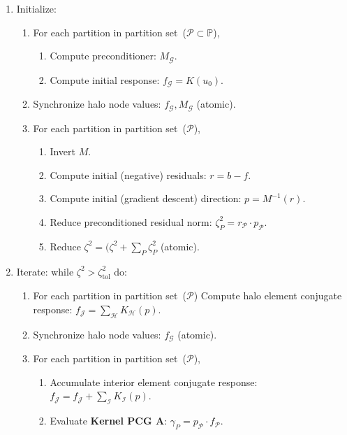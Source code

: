 \documentclass[]             %
{NASA}                       %
\begin{document}
\begin{algorithm}[ht] %
\caption{Latency-hiding parallel preconditioned conjugate gradient method}
\label{alg:halo-pcg}
\begin{enumerate}
\item Initialize:
\begin{enumerate}
\item For each partition in partition set~($\mathcal{P} \subset \mathbb{P}$),
\begin{enumerate}
\item Compute preconditioner: $M_{\mathcal{G}}$.
\item Compute initial response: $f_{\mathcal{G}}=K({u}_{0})$.
\end{enumerate}
\item Synchronize halo node values: $f_{\mathcal{G}},M_{\mathcal{G}}$ (atomic).
\item For each partition in partition set~($\mathcal{P}$),
\begin{enumerate}
\item Invert $M$.
\item Compute initial (negative) residuals: ${r}={b}-{f}$.
\item Compute initial (gradient descent) direction: ${p}=M^{-1}({r})$.
\item Reduce preconditioned residual norm: $\zeta_{P}^2={r}_{\mathcal{P}}\cdot{p}_{\mathcal{P}}$.
\item Reduce $\zeta^{2}=(\zeta^{2}+\sum_{P}\zeta_{P}^2$ (atomic).
\end{enumerate}
\end{enumerate}
\item Iterate: while $\zeta^{2}>\zeta_{\mathrm{tol}}^{2}$ do:
\begin{enumerate}
\item For each partition in partition set~($\mathcal{P}$) 
\newline
Compute halo element conjugate response: $f_{\mathcal{J}}=\sum_{\mathcal{H}}K_{\mathcal{H}}(p)$.
\item Synchronize halo node values: $f_{\mathcal{G}}$ (atomic).
\item For each partition in partition set~($\mathcal{P}$),
\begin{enumerate}
\item Accumulate interior element conjugate response: $f_{\mathcal{J}}=f_{\mathcal{J}}+\sum_{\mathcal{I}}K_{\mathcal{I}}(p)$.
\item Evaluate \textbf{Kernel PCG A}: $\gamma_{P}={p}_{\mathcal{\mathcal{P}}}\cdot{f}_{\mathcal{P}}$.

\end{enumerate}
\end{enumerate}
\end{enumerate}
\end{algorithm}
\end{document}
